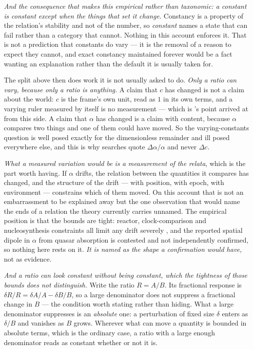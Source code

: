 \documentclass[11pt,a4paper]{article}
\theoremstyle{remark}\newtheorem{remark}[definition]{Remark}
\begin{document}
\emph{And the consequence that makes this empirical rather than taxonomic: a constant is constant
except when the things that set it change.} Constancy is a property of the relation's stability and
not of the number, so \emph{constant} names a state that can fail rather than a category that
cannot. Nothing in this account enforces it. That is not a prediction that constants do vary --- it
is the removal of a reason to expect they cannot, and exact constancy maintained forever would be a
fact wanting an explanation rather than the default it is usually taken for.

The split above then does work it is not usually asked to do. \emph{Only a ratio can vary, because
only a ratio is anything.} A claim that $c$ has changed is not a claim about the world: $c$ is the
frame's own unit, read as $1$ in its own terms, and a varying ruler measured by itself is no
measurement --- which is \citeauthor{duff2002}'s point arrived at from this side. A claim that
$\alpha$ has changed is a claim with content, because $\alpha$ compares two things and one of them
could have moved. So the varying-constants question is well posed exactly for the dimensionless
remainder and ill posed everywhere else, and this is why searches quote $\Delta\alpha/\alpha$ and
never $\Delta c$.

\emph{What a measured variation would be is a measurement of the relata}, which is the part worth
having. If $\alpha$ drifts, the relation between the quantities it compares has changed, and the
structure of the drift --- with position, with epoch, with environment --- constrains which of them
moved. On this account that is not an embarrassment to be explained away but the one observation
that would name the ends of a relation the theory currently carries unnamed. The empirical position
is that the bounds are tight: reactor, clock-comparison and nucleosynthesis constraints all limit
any drift severely \citep{uzan2011}, and the reported spatial dipole in $\alpha$ from quasar
absorption \citep{webb2011} is contested and not independently confirmed, so nothing here rests on
it. \emph{It is named as the shape a confirmation would have}, not as evidence.

\emph{And a ratio can look constant without being constant, which the tightness of those bounds does
not distinguish.} Write the ratio $R=A/B$. Its fractional response is
$\delta R/R=\delta A/A-\delta B/B$, so a large denominator does not suppress a fractional change in
$B$ --- the condition worth stating rather than hiding. What a large denominator suppresses is an
\emph{absolute} one: a perturbation of fixed size $\delta$ enters as $\delta/B$ and vanishes as $B$
grows. Wherever what can move a quantity is bounded in absolute terms, which is the ordinary case, a
ratio with a large enough denominator reads as constant whether or not it is.
\end{document}
